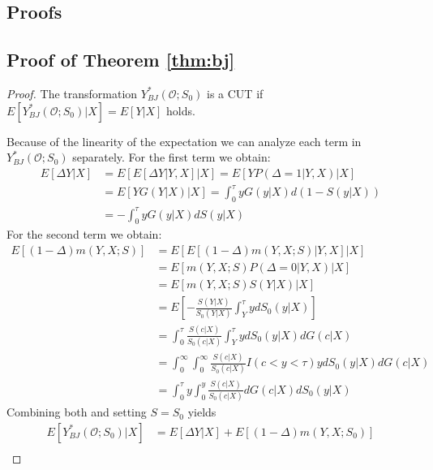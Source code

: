 \documentclass[12pt, a4paper]{scrartcl}
\theoremstyle{definition}
\theoremstyle{plain}
\numberwithin{equation}{section}
\numberwithin{figure}{section}
\numberwithin{table}{section}
\begin{document}
	\begin{appendices}
		\section{Proofs}
		\subsection{Proof of Theorem \ref{thm:bj}}\label{proof:bjcut}
		\begin{proof}
			The transformation $Y_{BJ}^*(\mathcal{O}; S_0)$ is a CUT if $E[Y_{BJ}^*(\mathcal{O}; S_0)\vert X] = E[Y\vert X]$ holds.
			
			Because of the linearity of the expectation we can analyze each term in $Y_{BJ}^*(\mathcal{O}; S_0)$ separately.
			For the first term we obtain:
			\begin{equation*}
			\begin{split}
			E[\Delta Y\vert X] &= E[E[\Delta Y \vert Y, X]\vert X] = E[Y P(\Delta = 1\vert Y,X)\vert X]\\
			&= E[Y G(Y\vert X)\vert X] = \int_{0}^{\tau} y G(y\vert X)d(1-S(y\vert X))\\
			&= - \int_{0}^{\tau} y G(y\vert X)dS(y\vert X)
			\end{split}
			\end{equation*}
			For the second term we obtain:
			\begin{equation*}
			\begin{split}
			E[(1-\Delta)m(Y,X;S)] &= E[E[(1-\Delta)m(Y,X;S)\vert Y,X]\vert X]\\
			&= E[m(Y,X;S)P(\Delta = 0\vert Y, X)\vert X]\\
			&= E[m(Y,X;S)S(Y\vert X)\vert X]\\
			&= E\left[-\frac{S(Y\vert X)}{S_0(Y\vert X)}\int_{Y}^{\tau}ydS_0(y\vert X)\right]\\
			&= \int_{0}^{\tau}\frac{S(c\vert X)}{S_0(c\vert X)}\int_{Y}^{\tau}ydS_0(y\vert X)dG(c\vert X)\\
			&= \int_0^{\infty}\int_0^{\infty} \frac{S(c\vert X)}{S_0(c\vert X)} I(c <y<\tau) y dS_0(y\vert X)dG(c\vert X)\\
			&= \int_0^{\tau}y\int_0^y \frac{S(c\vert X)}{S_0(c\vert X)} dG(c\vert X)dS_0(y\vert X)
			\end{split}
			\end{equation*}
			Combining both and setting $S=S_0$ yields
			\begin{equation*}
			\begin{split}
			E[Y_{BJ}^*(\mathcal{O}; S_0)\vert X] &= E[\Delta Y\vert X] + E[(1-\Delta)m(Y,X;S_0)]\\

\end{split}
\end{equation*}
\end{proof}
\end{appendices}
\end{document}
